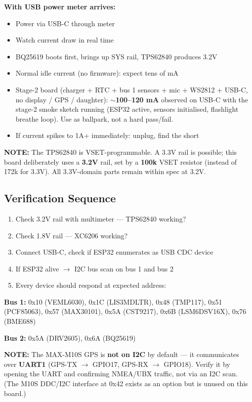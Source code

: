 \documentclass[11pt,a4paper]{article}
\newcommand{\notebox}[1]{\par\noindent\colorbox{headerblue!8}{\parbox{\dimexpr\textwidth-2\fboxsep}{%
\textcolor{headerblue}{\textbf{NOTE:}} #1}}\par\vspace{0.5em}}
\begin{document}
\textbf{With USB power meter arrives:}
\begin{itemize}[nosep]
\item Power via USB-C through meter
\item Watch current draw in real time
\item BQ25619 boots first, brings up SYS rail, TPS62840 produces 3.2V
\item Normal idle current (no firmware): expect tens of mA
\item Stage-2 board (charger + RTC + bus 1 sensors + mic + WS2812 + USB-C, no display / GPS / daughter): \textbf{$\sim$100--120 mA} observed on USB-C with the stage-2 smoke sketch running (ESP32 active, sensors initialised, flashlight breathe loop). Use as ballpark, not a hard pass/fail.
\item If current spikes to 1A+ immediately: unplug, find the short
\end{itemize}

\notebox{The TPS62840 is VSET-programmable. A 3.3V rail is possible; this board deliberately uses a \textbf{3.2V} rail, set by a \textbf{100k} VSET resistor (instead of 172k for 3.3V). All 3.3V-domain parts remain within spec at 3.2V.}

\subsection*{Verification Sequence}

\begin{enumerate}[nosep]
\item Check 3.2V rail with multimeter — TPS62840 working?
\item Check 1.8V rail — XC6206 working?
\item Connect USB-C, check if ESP32 enumerates as USB CDC device
\item If ESP32 alive $\rightarrow$ I2C bus scan on bus 1 and bus 2
\item Every device should respond at expected address:
\end{enumerate}

\textbf{Bus 1:} 0x10 (VEML6030), 0x1C (LIS3MDLTR), 0x48 (TMP117), 0x51 (PCF85063), 0x57 (MAX30101), 0x5A (CST9217), 0x6B (LSM6DSV16X), 0x76 (BME688)

\textbf{Bus 2:} 0x5A (DRV2605), 0x6A (BQ25619)

\notebox{The MAX-M10S GPS is \textbf{not on I2C} by default — it communicates over \textbf{UART1} (GPS-TX $\rightarrow$ GPIO17, GPS-RX $\rightarrow$ GPIO18). Verify it by opening the UART and confirming NMEA/UBX traffic, not via an I2C scan. (The M10S DDC/I2C interface at 0x42 exists as an option but is unused on this board.)}
\end{document}
